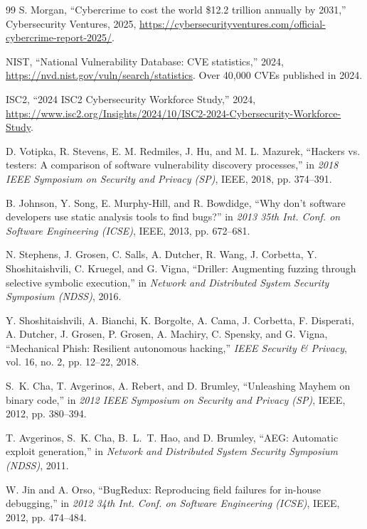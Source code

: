 \begin{thebibliography}{99}
S. Morgan, ``Cybercrime to cost the world \$12.2 trillion annually by 2031,'' Cybersecurity Ventures, 2025, \url{https://cybersecurityventures.com/official-cybercrime-report-2025/}.

NIST, ``National Vulnerability Database: CVE statistics,'' 2024, \url{https://nvd.nist.gov/vuln/search/statistics}. Over 40,000 CVEs published in 2024.

ISC2, ``2024 ISC2 Cybersecurity Workforce Study,'' 2024, \url{https://www.isc2.org/Insights/2024/10/ISC2-2024-Cybersecurity-Workforce-Study}.

D. Votipka, R. Stevens, E. M. Redmiles, J. Hu, and M. L. Mazurek, ``Hackers vs. testers: A comparison of software vulnerability discovery processes,'' in \textit{2018 IEEE Symposium on Security and Privacy (SP)}, IEEE, 2018, pp. 374--391.

B. Johnson, Y. Song, E. Murphy-Hill, and R. Bowdidge, ``Why don't software developers use static analysis tools to find bugs?'' in \textit{2013 35th Int. Conf. on Software Engineering (ICSE)}, IEEE, 2013, pp. 672--681.

N. Stephens, J. Grosen, C. Salls, A. Dutcher, R. Wang, J. Corbetta, Y. Shoshitaishvili, C. Kruegel, and G. Vigna, ``Driller: Augmenting fuzzing through selective symbolic execution,'' in \textit{Network and Distributed System Security Symposium (NDSS)}, 2016.

Y. Shoshitaishvili, A. Bianchi, K. Borgolte, A. Cama, J. Corbetta, F. Disperati, A. Dutcher, J. Grosen, P. Grosen, A. Machiry, C. Spensky, and G. Vigna, ``Mechanical Phish: Resilient autonomous hacking,'' \textit{IEEE Security \& Privacy}, vol. 16, no. 2, pp. 12--22, 2018.

S.~K. Cha, T. Avgerinos, A. Rebert, and D. Brumley, ``Unleashing Mayhem on binary code,'' in \textit{2012 IEEE Symposium on Security and Privacy (SP)}, IEEE, 2012, pp. 380--394.

T. Avgerinos, S.~K. Cha, B.~L.~T. Hao, and D. Brumley, ``AEG: Automatic exploit generation,'' in \textit{Network and Distributed System Security Symposium (NDSS)}, 2011.

W. Jin and A. Orso, ``BugRedux: Reproducing field failures for in-house debugging,'' in \textit{2012 34th Int. Conf. on Software Engineering (ICSE)}, IEEE, 2012, pp. 474--484.


\end{thebibliography}
